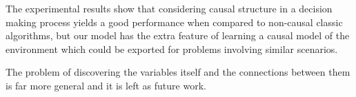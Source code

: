 \documentclass{article}
\begin{document}
The experimental results show that considering causal structure in a decision making process yields a good performance when compared to non-causal classic algorithms, but our model has the extra feature of learning a causal model of the environment which could be exported for problems involving similar scenarios.

The problem of discovering the variables itself and the connections between them is far more general and it is left as future work.



\end{document}
